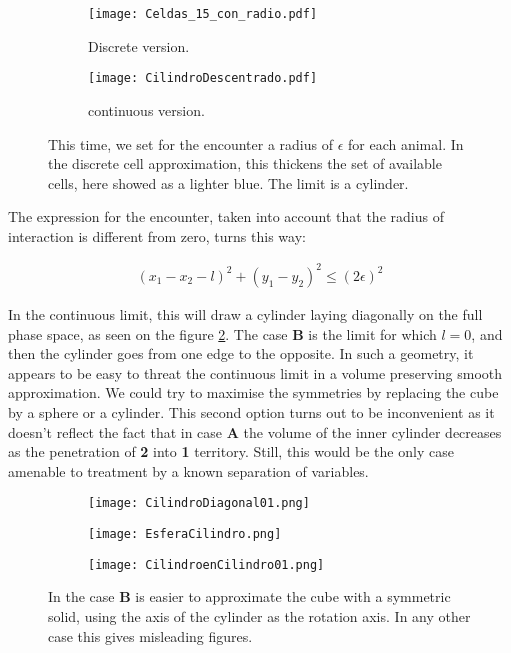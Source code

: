 \documentclass[letterpaperr,12pt]{article}
\newcommand{\Acase}{\textbf{A}\xspace}
\newcommand{\Bcase}{\textbf{B}\xspace}
\newcommand{\Uno}{\textbf{1}\xspace}
\newcommand{\Dos}{\textbf{2}\xspace}
\begin{document}
\begin{figure}[h]
  \centering
  \begin{subfigure}[b]{0.49\textwidth}
    \texttt{[image: Celdas\_15\_con\_radio.pdf]}
    \caption{Discrete version.}
    \label{celdasradio}
  \end{subfigure}
  \begin{subfigure}[b]{0.49\textwidth}
    \texttt{[image: CilindroDescentrado.pdf]}
    \caption{continuous version.}
    \label{continuoradio}
  \end{subfigure}
    \caption{This time, we set for the encounter a radius of
    $\epsilon$ for each animal. In the discrete cell approximation, 
    this thickens the set of available cells, here showed as a lighter blue.
    The limit is a cylinder.}
    \label{conradio}
\end{figure}

The expression for the encounter, taken into account that
the radius of interaction is different from zero, turns this way:

\begin{align}\label{radii}
 (x_1-x_2-l)^2+(y_1-y_2)^2 \leq (2\epsilon)^2 
\end{align}

In the continuous limit, this will draw a cylinder laying
diagonally on the full phase space, as seen on the figure 
\ref{continuoradio}. The case \Bcase is the limit for which $l=0$,
and then the cylinder goes from one edge to the opposite. In
such a geometry, it appears to be easy to threat the continuous limit
in a volume preserving smooth approximation. We could
try to maximise the symmetries by replacing the cube by a sphere or
a cylinder. This second option turns out to be inconvenient
as it doesn't reflect the fact that in case \Acase the
volume of the inner cylinder decreases as the penetration of
\Dos into \Uno territory. Still, this would be
the only case amenable to treatment by a known
separation of variables.

\begin{figure}[h]
  \centering
  \begin{subfigure}[b]{0.29\textwidth}
    \texttt{[image: CilindroDiagonal01.png]}
    \caption{}
    \label{CilDiag}
  \end{subfigure}
  \begin{subfigure}[b]{0.29\textwidth}
    \texttt{[image: EsferaCilindro.png]}
    \caption{}
    \label{EsferaCil}
  \end{subfigure}
  \begin{subfigure}[b]{0.29\textwidth}
    \texttt{[image: CilindroenCilindro01.png]}
    \caption{}
    \label{CilCil}
  \end{subfigure}
    \caption{In the case \Bcase is easier to approximate the 
    cube with a symmetric solid, using the axis of the cylinder
    as the rotation axis. In any other case this gives misleading figures.}
    \label{smoothapprox}
\end{figure}
\end{document}
